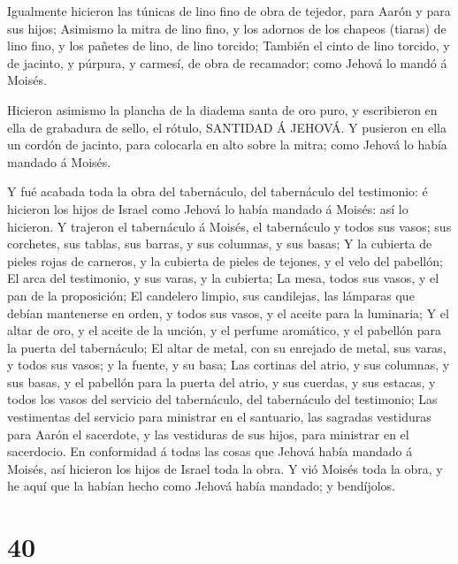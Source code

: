  Igualmente hicieron las túnicas de lino fino de obra de
tejedor, para Aarón y para sus hijos;  Asimismo la mitra de
lino fino, y los adornos de los chapeos (tiaras) de lino fino, y los
pañetes de lino, de lino torcido;  También el cinto de lino
torcido, y de jacinto, y púrpura, y carmesí, de obra de recamador; como
Jehová lo mandó á Moisés.

 Hicieron asimismo la plancha de la diadema santa de oro
puro, y escribieron en ella de grabadura de sello, el rótulo, SANTIDAD Á
JEHOVÁ.  Y pusieron en ella un cordón de jacinto, para
colocarla en alto sobre la mitra; como Jehová lo había mandado á Moisés.

 Y fué acabada toda la obra del tabernáculo, del
tabernáculo del testimonio: é hicieron los hijos de Israel como Jehová
lo había mandado á Moisés: así lo hicieron.  Y trajeron el
tabernáculo á Moisés, el tabernáculo y todos sus vasos; sus corchetes,
sus tablas, sus barras, y sus columnas, y sus basas;  Y la
cubierta de pieles rojas de carneros, y la cubierta de pieles de
tejones, y el velo del pabellón;  El arca del testimonio, y
sus varas, y la cubierta;  La mesa, todos sus vasos, y el
pan de la proposición;  El candelero limpio, sus
candilejas, las lámparas que debían mantenerse en orden, y todos sus
vasos, y el aceite para la luminaria;  Y el altar de oro, y
el aceite de la unción, y el perfume aromático, y el pabellón para la
puerta del tabernáculo;  El altar de metal, con su enrejado
de metal, sus varas, y todos sus vasos; y la fuente, y su basa;
 Las cortinas del atrio, y sus columnas, y sus basas, y el
pabellón para la puerta del atrio, y sus cuerdas, y sus estacas, y todos
los vasos del servicio del tabernáculo, del tabernáculo del testimonio;
 Las vestimentas del servicio para ministrar en el
santuario, las sagradas vestiduras para Aarón el sacerdote, y las
vestiduras de sus hijos, para ministrar en el sacerdocio. 
En conformidad á todas las cosas que Jehová había mandado á Moisés, así
hicieron los hijos de Israel toda la obra.  Y vió Moisés
toda la obra, y he aquí que la habían hecho como Jehová había mandado; y
bendíjolos.

\hypertarget{section-39}{%
\section{40}\label{section-39}}


